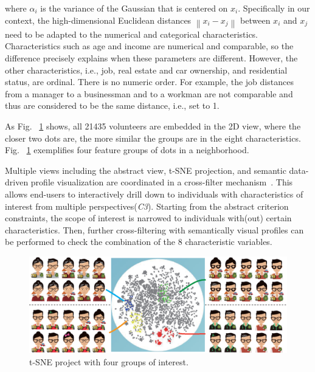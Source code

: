 \documentclass{ieeeaccess}
\begin{document}
where $\alpha_i$ is the variance of the Gaussian that is centered on $x_i$. Specifically in our context, the high-dimensional Euclidean distances $\left \| x_i - x_j \right \|$ between $x_i$ and $x_j$ need to be adapted to the numerical and categorical characteristics. Characteristics such as age and income are numerical and comparable, so the difference precisely explains when these parameters are different. However, the other characteristics, i.e., job, real estate and car ownership, and residential status, are ordinal. There is no numeric order. For example, the job distances from a manager to a businessman and to a workman are not comparable and thus are considered to be the same distance, i.e., set to 1.

As Fig. ~\ref{fig:tsne} shows, all 21435 volunteers are embedded in the 2D view, where the closer two dots are, the more similar the groups are in the eight characteristics. Fig. ~\ref{fig:tsne} exemplifies four feature groups of dots in a neighborhood.

Multiple views including the abstract view, t-SNE projection, and semantic data-driven profile visualization are coordinated in a cross-filter mechanism~\cite{Weaver2010}. This allows end-users to interactively drill down to individuals with characteristics of interest from multiple perspectives(\textit{C3}). Starting from the abstract criterion constraints, the scope of interest is narrowed to individuals with(out) certain characteristics. Then, further cross-filtering with semantically visual profiles can be performed to check the combination of the 8 characteristic variables.

\begin{figure}[htb!]
 \centering %
 \includegraphics[width=\columnwidth]{pictures/tsne}
 \caption{t-SNE project with four groups of interest.}
 \label{fig:tsne}
\end{figure}
\end{document}
